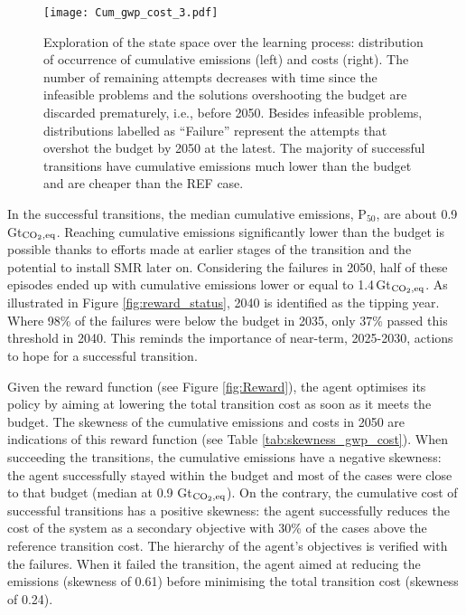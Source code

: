 \documentclass[11pt,twoside,a4paper,english]{article}
\def\ie{i.e., }
\begin{document}
\begin{figure}[!htbp]
\centering
\texttt{[image: Cum\_gwp\_cost\_3.pdf]}
\caption{Exploration of the state space over the learning process: distribution of occurrence of cumulative emissions (left) and costs (right). The number of remaining attempts decreases with time since the infeasible problems and the solutions overshooting the  budget are discarded prematurely, \ie before 2050. Besides infeasible problems, distributions labelled as ``Failure'' represent the attempts that overshot the  budget by 2050 at the latest. The majority of successful transitions have cumulative emissions much lower than the  budget and are cheaper than the REF case. }
\label{fig:Cum_gwp_cost}
\end{figure}

In the successful transitions, the median cumulative emissions, $\text{P}_{50}$, are about 0.9\,Gt$_{\ce{CO2},\text{eq}}$. Reaching cumulative emissions significantly lower than the  budget is possible thanks to efforts made at earlier stages of the transition and the potential to install \gls{SMR} later on. Considering the failures in 2050, half of these episodes ended up with cumulative emissions lower or equal to 1.4\,Gt$_{\ce{CO2},\text{eq}}$. As illustrated in Figure \ref{fig:reward_status}, 2040 is identified as the tipping year. Where 98\% of the failures were below the  budget in 2035, only 37\% passed this threshold in 2040. This reminds the importance of near-term, 2025-2030, actions to hope for a successful transition.

Given the reward function (see Figure \ref{fig:Reward}), the agent optimises its policy by aiming at lowering the total transition cost as soon as it meets the  budget. The skewness of the cumulative emissions and costs in 2050 are indications of this reward function (see Table \ref{tab:skewness_gwp_cost}). When succeeding the transitions, the cumulative emissions have a negative skewness: the agent successfully stayed within the budget and most of the cases were close to that budget (median at 0.9 Gt$_{\ce{CO2},\text{eq}}$). On the contrary, the cumulative cost of successful transitions has a positive skewness: the agent successfully reduces the cost of the system as a secondary objective with 30\% of the cases above the reference transition cost. The hierarchy of the agent's objectives is verified with the failures. When it failed the transition, the agent aimed at reducing the emissions (skewness of 0.61) before minimising the total transition cost (skewness of 0.24). 
\end{document}
